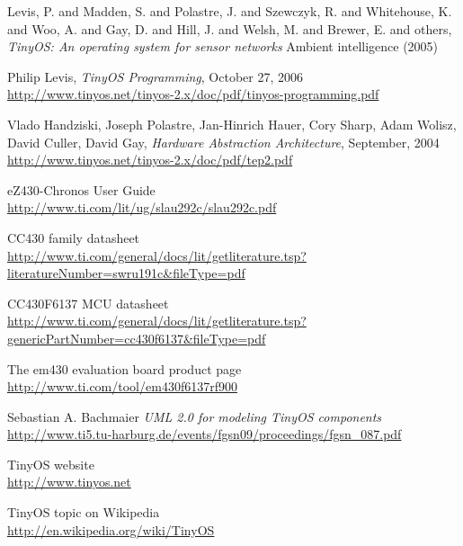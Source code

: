 \begin{thebibliography}{99}
Levis, P. and Madden, S. and Polastre, J. and Szewczyk, R. and Whitehouse, K. and Woo, A. and Gay, D. and Hill, J. and Welsh, M. and Brewer, E. and others,
\textit{TinyOS: An operating system for sensor networks}
Ambient intelligence (2005)

  Philip Levis, \textit{TinyOS Programming}, October 27, 2006 \\
  \url{http://www.tinyos.net/tinyos-2.x/doc/pdf/tinyos-programming.pdf}

  Vlado Handziski, Joseph Polastre, Jan-Hinrich Hauer, Cory Sharp,
  Adam Wolisz, David Culler, David Gay, \textit{Hardware Abstraction Architecture}, September,  2004 \\
  \url{http://www.tinyos.net/tinyos-2.x/doc/pdf/tep2.pdf}

  eZ430-Chronos User Guide \\
  \url{http://www.ti.com/lit/ug/slau292c/slau292c.pdf}

  CC430 family datasheet\\
  \url{http://www.ti.com/general/docs/lit/getliterature.tsp?literatureNumber=swru191c&fileType=pdf}

  CC430F6137 MCU datasheet \\
  \url{http://www.ti.com/general/docs/lit/getliterature.tsp?genericPartNumber=cc430f6137&fileType=pdf}

  The em430 evaluation board product page \\
  \url{http://www.ti.com/tool/em430f6137rf900}

  Sebastian A. Bachmaier
  \textit{UML 2.0 for modeling TinyOS components} \\
  \url{http://www.ti5.tu-harburg.de/events/fgsn09/proceedings/fgsn_087.pdf}

  TinyOS website \\
  \url{http://www.tinyos.net}

  TinyOS topic on Wikipedia \\
  \url{http://en.wikipedia.org/wiki/TinyOS}


\end{thebibliography}
